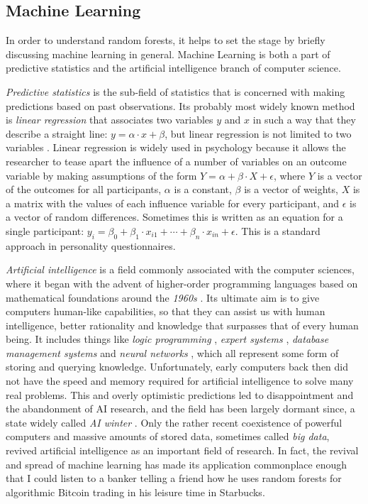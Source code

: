 \documentclass[a4paper,man,12pt,apacite,floatsintext]{apa6} %
\begin{document}
\subsection{Machine Learning}
In order to understand random forests, it helps to set
the stage by briefly discussing machine learning in general.
Machine Learning is both a part of predictive statistics and the
artificial intelligence branch of computer science.

\emph{Predictive statistics} is the sub-field of statistics that is
concerned with making predictions based on past observations.
Its probably most widely known method is \emph{linear regression}
that associates two variables \(y\) and \(x\) in such a way
that they describe a straight line: \(y = \alpha \cdot x + \beta \), but
linear regression is not limited to two variables \cite{borzlinreg}.
Linear regression is widely used in psychology because it
allows the researcher to tease apart the influence of a number of variables on an
outcome variable by making assumptions of the form
\( Y = \alpha + \beta \cdot X + \epsilon \), where \(Y\) is a vector of
the outcomes for all participants, \(\alpha\) is a constant,
\(\beta\) is a vector of weights, \(X\) is a matrix with the values of each influence variable for
every participant, and \(\epsilon\) is a vector of random differences.
Sometimes this is written as an equation for a single participant:
\( y_{i} = \beta_{0} + \beta_{1} \cdot x_{i1} + \dotsb + \beta_{n} \cdot x_{in} + \epsilon \).
This is a standard approach in personality questionnaires.

\emph{Artificial intelligence} is a field commonly associated with the
computer sciences, where it began with the advent of higher-order
programming languages based on mathematical foundations around the \emph{1960s} \cite{wpHOPL}.
Its ultimate aim is to give computers human-like capabilities,
so that they can assist us with human intelligence, better rationality
and knowledge that surpasses that of every human being.
It includes things like \emph{logic programming} \cite{wpLP, qai},
\emph{expert systems} \cite{wpES, qai}, \emph{database management systems} \cite{wpDB} and
\emph{neural networks} \cite{haykin, qai}, which all represent some form of
storing and querying knowledge.
Unfortunately, early computers back then did not have the speed and memory
required for artificial intelligence to solve many real problems.
This and overly optimistic predictions led to disappointment and the abandonment of AI research,
and the field has been largely dormant since, a state widely called \emph{AI winter} \cite{qai, wpHOAI}.
Only the rather recent coexistence of powerful computers and massive amounts
of stored data, sometimes called \emph{big data}, revived artificial
intelligence as an important field of research.
In fact, the revival and spread of machine learning has made its application
commonplace enough that I could listen to a banker telling a friend how
he uses random forests for algorithmic Bitcoin trading in his leisure time
in Starbucks.
\end{document}
